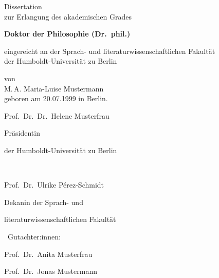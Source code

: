 \begin{center}
\begin{minipage}{.99\textwidth}
\begin{center}
	\end{center}
\end{minipage}


\vspace{1.4cm}


\begin{minipage}{.99\textwidth}
\centering
	Dissertation\\
	zur Erlangung des akademischen Grades 


\vspace{.3cm}


	\textbf{Doktor der Philosophie (Dr.\ phil.)}


\vspace{.3cm}


	eingereicht an der Sprach- und literaturwissenschaftlichen Fakultät\\
	der Humboldt-Universität zu Berlin


\vspace{.5cm}


	von\\
	M.\,A. Maria-Luise Mustermann\\
	geboren am 20.07.1999 in Berlin.
\end{minipage}


\vspace{.9cm}


\begin{minipage}[][][t]{.99\textwidth}
\centering	
	\begin{minipage}[][][t]{.48\textwidth}
	Prof.\ Dr.\ Dr.\ Helene Musterfrau
	
	Präsidentin
	
	der Humboldt-Universität zu Berlin
	\end{minipage} 
	\begin{minipage}[][][t]{.03\textwidth}
	~
	\end{minipage}	
	\begin{minipage}[][][t]{.46\textwidth}
		Prof.\ Dr.\ Ulrike Pérez-Schmidt
		
		Dekanin
		der Sprach- und 
		
		literaturwissenschaftlichen Fakultät
	\end{minipage}
\end{minipage}


\vspace{.85cm}


\begin{minipage}{.99\textwidth}

	~Gutachter:innen:

	\begin{enumerate*}
		\item Prof.\ Dr.\ Anita Musterfrau
		\item Prof.\ Dr.\ Jonas Mustermann
	\end{enumerate*}

\end{minipage}


\end{center}